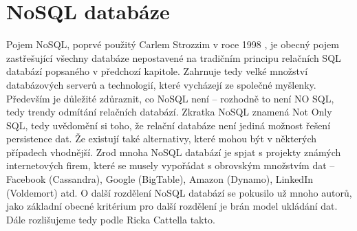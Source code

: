\chapter{NoSQL databáze}
Pojem NoSQL, poprvé použitý Carlem Strozzim v roce 1998 \cite{strozziNoSQL}, je obecný pojem zastřešující všechny databáze nepostavené na tradičním principu relačních SQL databází popsaného v předchozí kapitole. Zahrnuje tedy velké množství databázových serverů a technologií, které  vycházejí ze společné myšlenky.
Především je důležité zdůraznit, co NoSQL není – rozhodně to není NO SQL, tedy trendy odmítání relačních databází. Zkratka NoSQL znamená Not Only SQL, tedy uvědomění si toho, že relační databáze není jediná možnost řešení persistence dat. Že existují také alternativy, které mohou být v některých případech vhodnější. Zrod mnoha NoSQL databází je spjat s projekty známých internetových firem, které se musely vypořádat s obrovským množstvím dat – Facebook (Cassandra), Google (BigTable), Amazon (Dynamo), LinkedIn (Voldemort) atd. \cite{augiNoSQL}
O další rozdělení NoSQL databází se pokusilo už mnoho autorů, jako základní obecné kritérium pro další rozdělení je brán model ukládání dat.  Dále rozlišujeme tedy podle Ricka Cattella \cite{cattellStores} takto.

